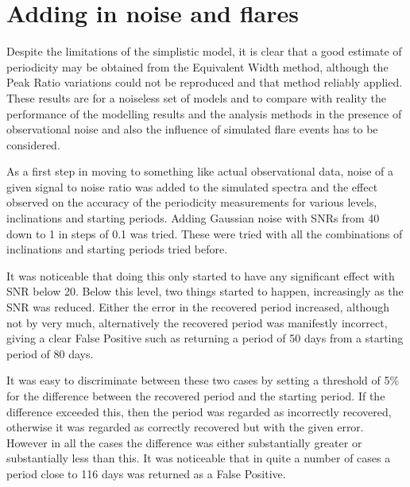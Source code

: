 \section{Adding in noise and flares}
\protect\label{section:addflares}

Despite the limitations of the simplistic model, it is clear that a good estimate of periodicity may be obtained from
the Equivalent Width method, although the Peak Ratio variations could not be reproduced and that method reliably applied.
These results are for a noiseless set of models and to compare with reality the performance of the modelling results and
the analysis methods in the presence of observational noise and also the influence of simulated flare events has to be
considered.

As a first step in moving to something like actual observational data, noise of a given signal to noise ratio was added
to the simulated spectra and the effect observed on the accuracy of the periodicity measurements for various levels,
inclinations and starting periods. Adding Gaussian noise with SNRs from 40 down to 1 in steps of 0.1 was tried.
These were tried with all the combinations of inclinations and starting periods tried before.

It was noticeable that doing this only started to have any significant effect with SNR below 20. Below this level, two
things started to happen, increasingly as the SNR was reduced. Either the error in the recovered period increased,
although not by very much, alternatively the recovered period was manifestly incorrect, giving a clear False Positive
such as returning a period of 50 days from a starting period of 80 days.

It was easy to discriminate between these two cases by setting a threshold of 5\% for the difference between the
recovered period and the starting period. If the difference exceeded this, then the period was regarded as incorrectly
recovered, otherwise it was regarded as correctly recovered but with the given error. However in all the cases the
difference was either substantially greater or substantially less than this. It was noticeable that in quite a number of
cases a period close to 116 days was returned as a False Positive.

